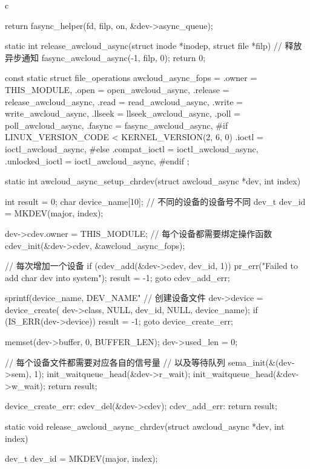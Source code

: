 \begin{code-block}{c}
{{{        return fasync_helper(fd, filp, on, &dev->async_queue);
}

static int release_awcloud_async(struct inode *inodep, struct file *filp)
{
        // 释放异步通知
        fasync_awcloud_async(-1, filp, 0);
        return 0;
}

const static struct file_operations awcloud_async_fops = {
        .owner          = THIS_MODULE,
        .open           = open_awcloud_async,
        .release        = release_awcloud_async,
        .read           = read_awcloud_async,
        .write          = write_awcloud_async,
        .llseek         = llseek_awcloud_async,
        .poll           = poll_awcloud_async,
        .fasync         = fasync_awcloud_async,
#if LINUX_VERSION_CODE < KERNEL_VERSION(2, 6, 0)
        .ioctl          = ioctl_awcloud_async,
#else
        .compat_ioctl   = ioctl_awcloud_async,
        .unlocked_ioctl = ioctl_awcloud_async,
#endif
};

static int awcloud_async_setup_chrdev(struct awcloud_async *dev, int index)
{
        int result = 0;
        char device_name[10];
        // 不同的设备的设备号不同
        dev_t dev_id = MKDEV(major, index);

        dev->cdev.owner = THIS_MODULE;
        // 每个设备都需要绑定操作函数
        cdev_init(&dev->cdev, &awcloud_async_fops);

        // 每次增加一个设备
        if (cdev_add(&dev->cdev, dev_id, 1)) {
                pr_err("Failed to add char dev into system\n");
                result = -1;
                goto cdev_add_err;
        }

        sprintf(device_name, DEV_NAME"%
        // 创建设备文件
        dev->device = device_create(
                dev->class, NULL, dev_id, NULL, device_name);
        if (IS_ERR(dev->device)) {
                result = -1;
                goto device_create_err;
        }

        memset(dev->buffer, 0, BUFFER_LEN);
        dev->used_len = 0;

        // 每个设备文件都需要对应各自的信号量
        // 以及等待队列
        sema_init(&(dev->sem), 1);
        init_waitqueue_head(&dev->r_wait);
        init_waitqueue_head(&dev->w_wait);
        return result;

device_create_err:
        cdev_del(&dev->cdev);
cdev_add_err:
        return result;
}

static void release_awcloud_async_chrdev(struct awcloud_async *dev, int index)
{
        dev_t dev_id = MKDEV(major, index);

}}}
\end{code-block}
